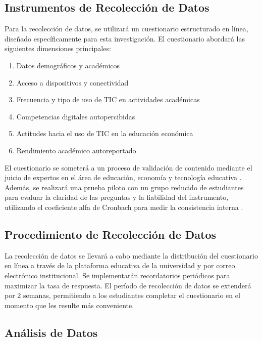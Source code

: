 \documentclass[12pt, a4paper]{article}
\begin{document}
\subsection{Instrumentos de Recolección de Datos}

Para la recolección de datos, se utilizará un cuestionario estructurado en línea, diseñado específicamente para esta investigación. El cuestionario abordará las siguientes dimensiones principales:

\begin{enumerate}
    \item Datos demográficos y académicos
    \item Acceso a dispositivos y conectividad
    \item Frecuencia y tipo de uso de TIC en actividades académicas
    \item Competencias digitales autopercibidas
    \item Actitudes hacia el uso de TIC en la educación económica
    \item Rendimiento académico autoreportado
\end{enumerate}

El cuestionario se someterá a un proceso de validación de contenido mediante el juicio de expertos en el área de educación, economía y tecnología educativa \parencite{Lawshe1975}. Además, se realizará una prueba piloto con un grupo reducido de estudiantes para evaluar la claridad de las preguntas y la fiabilidad del instrumento, utilizando el coeficiente alfa de Cronbach para medir la consistencia interna \parencite{Cronbach1951}.

\subsection{Procedimiento de Recolección de Datos}

La recolección de datos se llevará a cabo mediante la distribución del cuestionario en línea a través de la plataforma educativa de la universidad y por correo electrónico institucional. Se implementarán recordatorios periódicos para maximizar la tasa de respuesta. El período de recolección de datos se extenderá por 2 semanas, permitiendo a los estudiantes completar el cuestionario en el momento que les resulte más conveniente.

\subsection{Análisis de Datos}
\end{document}

